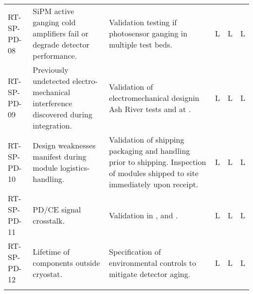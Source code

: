 \begin{footnotesize}
\begin{longtable}{x{0.18\textwidth}x{0.20\textwidth}x{0.32\textwidth}x{0.02\textwidth}x{0.02\textwidth}x{0.02\textwidth}}
RT-SP-PD-08 & SiPM active ganging cold amplifiers fail or degrade detector performance. & Validation testing if photosensor ganging in multiple test beds. & L & L & L \\  \colhline
RT-SP-PD-09 & Previously undetected electro-mechanical interference discovered during integration. & Validation of electromechanical designin Ash River tests and at . & L & L & L \\  \colhline
RT-SP-PD-10 & Design weaknesses manifest during module logistics-handling. & Validation of shipping packaging and handling prior to shipping.  Inspection of modules shipped to site immediately upon receipt. & L & L & L \\  \colhline
RT-SP-PD-11 & PD/CE signal crosstalk. & Validation in ,  and . & L & L & L \\  \colhline
RT-SP-PD-12 & Lifetime of  components outside cryostat. & Specification of environmental controls to mitigate detector aging. & L & L & L \\  \colhline

\label{tab:risks:SP-FD-PD}
\end{longtable}
\end{footnotesize}